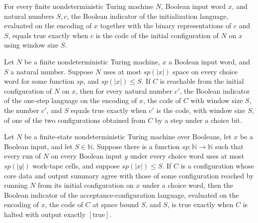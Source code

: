 \begin{theorem}
\label{Randomized.PolyAmp.ampOr_init}
\leanok
{}
For every finite nondeterministic Turing machine $N$, Boolean input word $x$, and
natural numbers $S,c$, the Boolean indicator of the initialization language, evaluated
on the encoding of $x$ together with the binary representations of $c$ and $S$, equals
true exactly when $c$ is the code of the initial configuration of $N$ on $x$ using
window size $S$.
\end{theorem}

\begin{theorem}
\label{Randomized.PolyAmp.ampOr_step}
\leanok
{}
Let $N$ be a finite nondeterministic Turing machine, $x$ a Boolean input word, and $S$ a
natural number. Suppose $N$ uses at most $sp(|x|)$ space on every choice word for some
function $sp$, and $sp(|x|)\le S$. If $C$ is reachable from the initial configuration of
$N$ on $x$, then for every natural number $c'$, the Boolean indicator of the one-step
language on the encoding of $x$, the code of $C$ with window size $S$, the number $c'$,
and $S$ equals true exactly when $c'$ is the code, with window size $S$, of one of the
two configurations obtained from $C$ by a step under a choice bit.
\end{theorem}

\begin{theorem}
\label{Randomized.PolyAmp.ampOr_accept}
\leanok
{}
Let $N$ be a finite-state nondeterministic Turing machine over Booleans, let $x$ be a
Boolean input, and let $S\in\mathbb{N}$. Suppose there is a function
$sp:\mathbb{N}\to\mathbb{N}$ such that every run of $N$ on every Boolean input $y$ under
every choice word uses at most $sp(|y|)$ work-tape cells, and suppose $sp(|x|)\le S$. If
$C$ is a configuration whose core data and output summary agree with those of some
configuration reached by running $N$ from its initial configuration on $x$ under a
choice word, then the Boolean indicator of the acceptance-configuration language,
evaluated on the encoding of $x$, the code of $C$ at space bound $S$, and $S$, is true
exactly when $C$ is halted with output exactly $[\mathrm{true}]$.
\end{theorem}


